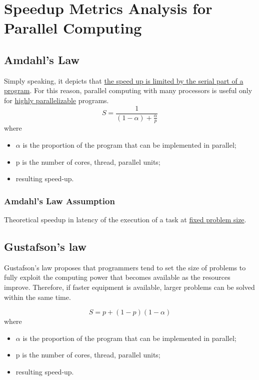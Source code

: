\documentclass[12pt]{article}
\numberwithin{equation}{section}
\numberwithin{table}{section}
\numberwithin{figure}{section}
\begin{document}
\section{Speedup Metrics Analysis for Parallel Computing}
\subsection*{Amdahl's Law}
Simply speaking, it depicts that \underline{the speed up is limited by the serial part of a program}. For this reason, parallel computing with many processors is useful only for \underline{highly parallelizable} programs.
\begin{equation}
	S = \frac{1}{(1-\alpha) + \frac{\alpha}{p}}
\end{equation}
where

\begin{itemize}
	\item $\alpha$ is the proportion of the program that can be implemented in parallel;
	
	\item p is the number of cores, thread, parallel units;
	
	\item resulting speed-up.
\end{itemize}

\subsubsection*{Amdahl's Law Assumption}Theoretical speedup in latency of the execution of a task at \underline{fixed problem size}.\cite{AMDAHL}

\subsection*{Gustafson's law}
Gustafson's law proposes that programmers tend to set the size of problems to fully exploit the computing power that becomes available as the resources improve. Therefore, if faster equipment is available, larger problems can be solved within the same time.

\begin{equation}
	S = p + (1-p)(1-\alpha)
\end{equation}
where

\begin{itemize}
	\item $\alpha$ is the proportion of the program that can be implemented in parallel;
	
	\item p is the number of cores, thread, parallel units;
	
	\item resulting speed-up.
\end{itemize}
\end{document}
